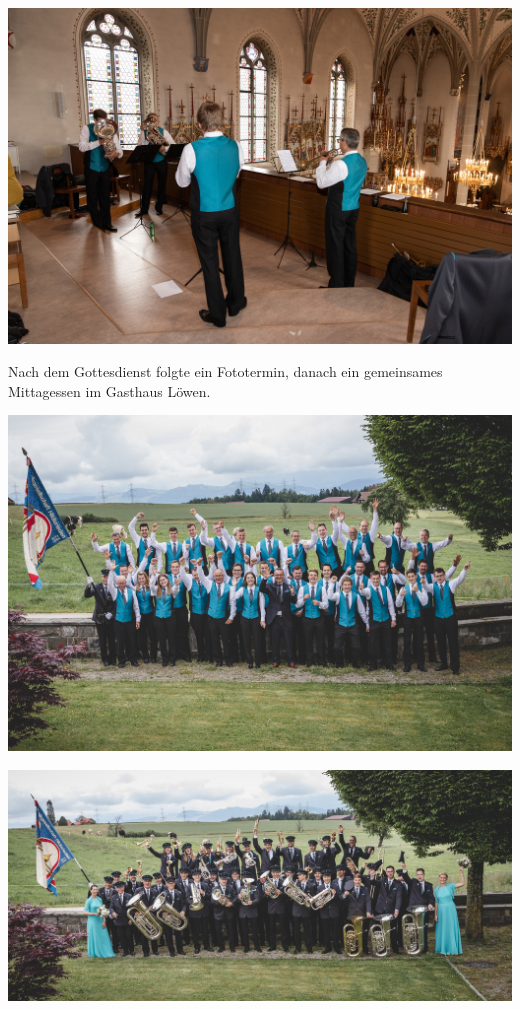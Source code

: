 \begin{history}
    \begin{MulticolFigure}
        \centering
        \includegraphics[width=0.93\linewidth]{./chap/2001-2024/2021/Kirchenquartett-1.jpg}
    \end{MulticolFigure}

    Nach dem Gottesdienst folgte ein Fototermin, danach ein gemeinsames
    Mittagessen im Gasthaus Löwen.

    \begin{MulticolFigure}
        \centering
        \includegraphics[width=0.93\linewidth]{./chap/2001-2024/2021/MGH-2021-Gilet.jpg}
    \end{MulticolFigure}

    \begin{MulticolFigure}
        \centering
        \includegraphics[width=0.93\linewidth]{./chap/2001-2024/2021/MGH-2021-lustig.jpg}
    \end{MulticolFigure}


\end{history}
